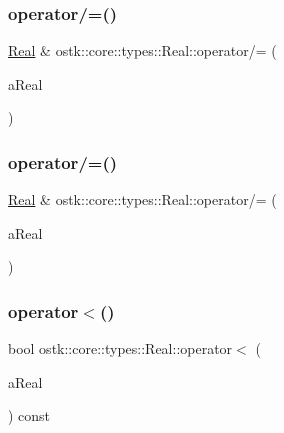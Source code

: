 \mbox{\label{classostk_1_1core_1_1types_1_1_real_a86e0dad5db89606b6cdbaaffd0d0e26c}} 
\subsubsection{\texorpdfstring{operator/=()}{operator/=()}\hspace{0.1cm}{\footnotesize\ttfamily [1/2]}}
{\footnotesize\ttfamily \hyperlink{classostk_1_1core_1_1types_1_1_real}{Real} \& ostk\+::core\+::types\+::\+Real\+::operator/= (\begin{DoxyParamCaption}\item[{const \hyperlink{classostk_1_1core_1_1types_1_1_real}{Real} \&}]{a\+Real }\end{DoxyParamCaption})}

\mbox{\label{classostk_1_1core_1_1types_1_1_real_aa446982652f6a965deb3bcf918bbe011}} 
\subsubsection{\texorpdfstring{operator/=()}{operator/=()}\hspace{0.1cm}{\footnotesize\ttfamily [2/2]}}
{\footnotesize\ttfamily \hyperlink{classostk_1_1core_1_1types_1_1_real}{Real} \& ostk\+::core\+::types\+::\+Real\+::operator/= (\begin{DoxyParamCaption}\item[{const \hyperlink{classostk_1_1core_1_1types_1_1_real_aa26f796c30b514c98d573f82e3b02296}{Real\+::\+Value\+Type} \&}]{a\+Real }\end{DoxyParamCaption})}

\mbox{\label{classostk_1_1core_1_1types_1_1_real_ae9fc3274a73cb21959f45064548e642c}} 
\subsubsection{\texorpdfstring{operator$<$()}{operator<()}\hspace{0.1cm}{\footnotesize\ttfamily [1/2]}}
{\footnotesize\ttfamily bool ostk\+::core\+::types\+::\+Real\+::operator$<$ (\begin{DoxyParamCaption}\item[{const \hyperlink{classostk_1_1core_1_1types_1_1_real}{Real} \&}]{a\+Real }\end{DoxyParamCaption}) const}

